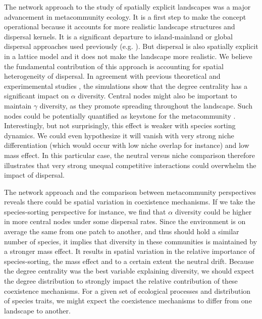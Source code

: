 \documentclass[12pt]{article}
\begin{document}
The network approach to the study of spatially explicit landscapes was a major
advancement in metacommunity ecology. It is a first step to make the concept
operational because it accounts for more realistic landscape structures and
dispersal kernels. It is a significant departure to island-mainland or
global dispersal approaches used previously (e.g. \textcite{Tilman1994a,
Hubbell2001, Mouquet2002}). But dispersal is also spatially explicit in a
lattice model and it does not make the landscape more realistic. We believe the
fundamental contribution of this approach is accounting for spatial
heterogeneity of dispersal. In agreement with previous theoretical
\parencite{Economo2011, Desjardins2012b} and experimemental studies
\parencite{Carrara2012}, the simulations show that the degree centrality has a
significant impact on $\alpha$ diversity. Central nodes might also be important
to maintain $\gamma$ diversity, as they promote spreading
throughout the landscape. Such nodes could be potentially quantified as keystone
for the metacommunity \parencite{Mouquet2013}. Interestingly, but not
surprisingly, this effect is weaker with species sorting dynamics. We could even
hypothesize it will vanish with very strong niche differentiation (which would occur with
low niche overlap for instance) and low mass effect. In this particular case, the
neutral versus niche comparison therefore illustrates that very strong unequal
competitive interactions could overwhelm the impact of dispersal.

The network approach and the comparison between metacommunity perspectives
reveals there could be spatial variation in coexistence mechanisms. If we take
the species-sorting perspective for instance, we find that $\alpha$ diversity
could be higher in more central nodes under some dispersal rates. Since the
environment is on average the same from one patch to another, and thus should
hold a similar number of species, it implies that diversity in these communities
is maintained by a stronger mass effect. It results in spatial variation in the
relative importance of species-sorting, the mass effect and to a certain extent
the neutral drift. Because the degree centrality was the best variable
explaining diversity, we should expect the degree distribution to strongly
impact the relative contribution of these coexistence mechanisms. For a given
set of ecological processes and distribution of species traits, we might expect
the coexistence mechanisms to differ from one landscape to another.
\end{document}
